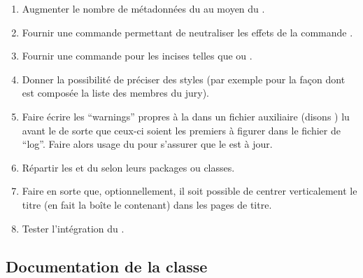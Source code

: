 \begin{enumerate}
\item Augmenter le nombre de métadonnées du  au moyen du
  .
\item Fournir une commande  permettant de
  neutraliser les effets de la commande .
\item Fournir une commande  pour les incises telles que
   ou .
\item Donner la possibilité de préciser des styles (par exemple pour la façon
  dont est composée la liste des membres du jury).
\item Faire écrire les \foreignquote{english}{warnings} propres à la \yatcl{}
  dans un fichier auxiliaire (disons ) lu avant le  de sorte que ceux-ci
  soient les premiers à figurer dans le fichier de
  \foreignquote{english}{log}. Faire alors usage du 
  pour s'assurer que le  est à jour.
\item Répartir les  et  du
   selon leurs packages ou classes.
\item Faire en sorte que, optionnellement, il soit possible de centrer
  verticalement le titre (en fait la boîte le contenant) dans les pages de
  titre.
\item Tester l'intégration du .
\end{enumerate}

\subsection{Documentation de la classe}
\label{sec:documentation-de-la-ult}

